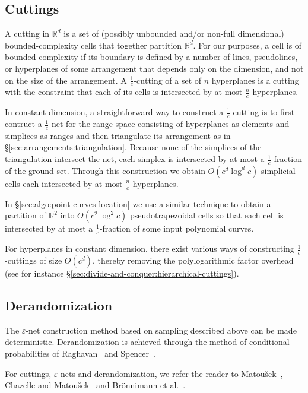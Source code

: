 \subsection{Cuttings}%
\label{sec:divide-and-conquer:cuttings}

A cutting in \(\mathbb{R}^d\)
is a set of (possibly unbounded and/or non-full dimensional)
bounded-complexity cells that together partition \(\mathbb{R}^{d}\).
%
For our purposes, a cell is of bounded complexity if its boundary is defined by
a number of lines, pseudolines, or hyperplanes of some arrangement
that depends only on the dimension, and not on the size of the arrangement.
%
A \(\frac{1}{c}\)-cutting of a set of \(n\) hyperplanes is a cutting with the
constraint that each of its cells is intersected by at most \(\frac{n}{c}\)
hyperplanes.

In constant dimension,
a straightforward way to construct a \(\frac 1c\)-cutting is to first contruct
a \(\frac 1c\)-net for the range space consisting of hyperplanes as elements
and simplices as ranges and then triangulate its arrangement as in
\S\ref{sec:arrangements:triangulation}. Because none of the simplices of the
triangulation intersect the net, each simplex is intersected by at most a
\(\frac 1c\)-fraction of the ground set.
%
Through this construction we obtain \(O(c^d \log^d c)\) simplicial cells each
intersected by at most \(\frac{n}{c}\) hyperplanes.

In \S\ref{sec:algo:point-curves-location} we use a similar technique to obtain
a partition of \(\mathbb{R}^2\) into \(O(c^2 \log^2 c)\) pseudotrapezoidal
cells so that each cell is intersected by at most a \(\frac 1c\)-fraction of
some input polynomial curves.

For hyperplanes in constant dimension,
there exist various ways of constructing \(\frac{1}{c}\)-cuttings of size
\(O(c^d)\), thereby removing the polylogarithmic factor overhead (see for
instance \S\ref{sec:divide-and-conquer:hierarchical-cuttings}).


\subsection{Derandomization}

The
\(\varepsilon\)-net
construction method based on sampling
described above can be made deterministic.
%
Derandomization is achieved through
the method of conditional probabilities of Raghavan~\cite{Rag88}
and Spencer~\cite{Spe94}.

For cuttings, $\varepsilon$-nets and derandomization, we
refer the reader to Matou\v{s}ek~\cite{M95,M96}, Chazelle and
Matou\v{s}ek~\cite{CM96} and Brönnimann et al.~\cite{BCM99}.

